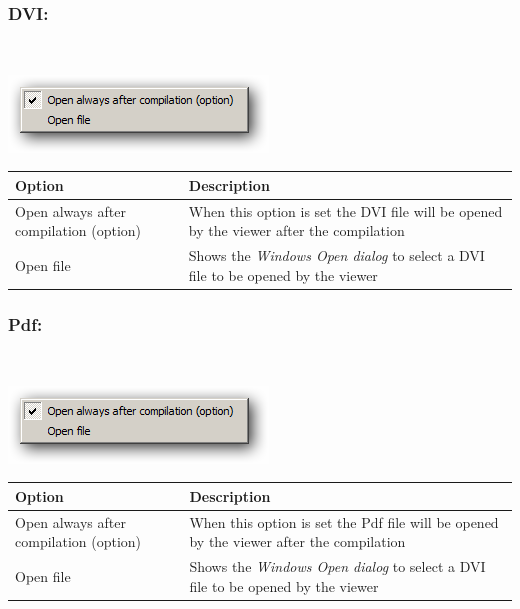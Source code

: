 \hypertarget{menu_tools_processing_viewer_DVI}{}
\subsubsection{DVI:}\\

\includegraphics[scale=0.50]{./res/menu_tools_processing_viewer_dvi.png}\\

\begin{scriptsize}\begin{tabularx}{\textwidth}{>{\hsize=0.7\hsize}X>{\hsize=0.7\hsize}X}\\
    \hline
    \textbf{Option} & \textbf{Description} \\
    \hline
    Open always after compilation (option) & When this option is set the DVI file will be opened by the viewer after the compilation \\
    Open file & Shows the \textit{Windows Open dialog} to select a DVI file to be opened by the viewer \\
    \hline
  \end{tabularx}\end{scriptsize}


\hypertarget{menu_tools_processing_viewer_pdf}{}
\subsubsection{Pdf:}\\

\includegraphics[scale=0.50]{./res/menu_tools_processing_viewer_pdf.png}\\

\begin{scriptsize}\begin{tabularx}{\textwidth}{>{\hsize=0.7\hsize}X>{\hsize=0.7\hsize}X}\\
    \hline
    \textbf{Option} & \textbf{Description} \\
    \hline
    Open always after compilation (option) & When this option is set the Pdf file will be opened by the viewer after the compilation \\
    Open file & Shows the \textit{Windows Open dialog} to select a DVI file to be opened by the viewer \\
    \hline
  \end{tabularx}\end{scriptsize}


